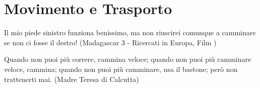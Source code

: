 \section{Movimento e Trasporto}\label{movimentocap}

\label{movimento-e-trasporto}

\begin{enfasi}{
Il mio piede sinistro funziona benissimo, ma non riuscirei comunque a camminare se non ci fosse il destro! (Madagascar 3 - Ricercati in Europa, Film )

\medskip

Quando non puoi più correre, cammina veloce; quando non puoi più camminare veloce, cammina; quando non puoi più camminare, usa il bastone; però non trattenerti mai. (Madre Teresa di Calcutta)}
\end{enfasi}

